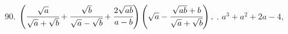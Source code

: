 90. $\left(\cfrac{\sqrt{a}}{\sqrt{a}+\sqrt{b}}+\cfrac{\sqrt{b}}{\sqrt{a}-\sqrt{b}}+\cfrac{2\sqrt{ab}}{a-b}\right)\left(\sqrt{a}-\cfrac{\sqrt{ab}+b}{\sqrt{a}+\sqrt{b}}\right),$
. $a^3+a^2+2a-4,$\\
